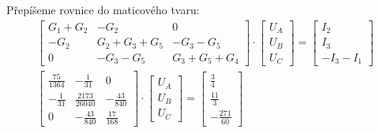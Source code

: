 \documentclass[12pt,a4paper]{article}
\begin{document}
	Přepíšeme rovnice do maticového tvaru:
	\begin{gather*}
		\begin{bmatrix}
			G_1 + G_2	&	-G_2				   &	0 \\
			-G_2 		&	G_2 + G_3 + G_5    &	-G_3 - G_5 \\
			0			&	-G_3 - G_5 		   &	G_3 + G_5 + G_4
		\end{bmatrix}
		\cdot
		\begin{bmatrix}
			U_A \\
			U_B \\
			U_C
		\end{bmatrix}
		=
		\begin{bmatrix}
			I_2 \\
			I_3 \\
			-I_3 - I_1
		\end{bmatrix}
		\\
		\begin{bmatrix}
			\frac{75}{1364}	&	-\frac{1}{31}		  &	0 \\[6pt]
			-\frac{1}{31} 	&	\frac{2173}{26040}    &	-\frac{43}{840} \\[6pt]
			0				&	-\frac{43}{840} 	  &	\frac{17}{168}
		\end{bmatrix}
		\cdot
		\begin{bmatrix}
			U_A \\[6pt]
			U_B \\[6pt]
			U_C
		\end{bmatrix}
		=
		\begin{bmatrix}
			\frac{3}{4} \\[6pt]
			\frac{11}{3} \\[6pt]
			-\frac{271}{60}
		\end{bmatrix}
	\end{gather*}
\end{document}
